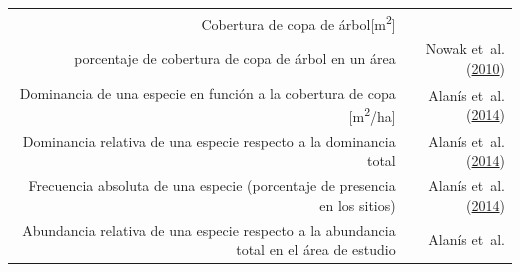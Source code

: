 \documentclass[12pt,a4paper,openany]{book}
\theoremstyle{definition}
\theoremstyle{definition}
\theoremstyle{definition}
\theoremstyle{remark}
\begin{document}
\begin{longtable}[]{@{}rr@{}}
\begin{minipage}[t]{0.57\columnwidth}\raggedleft\strut
Cobertura de copa de árbol{[}m\textsuperscript{2}{]}\strut
\end{minipage} & \begin{minipage}[t]{0.31\columnwidth}\raggedleft\strut
\strut
\end{minipage}\tabularnewline
\begin{minipage}[t]{0.57\columnwidth}\raggedleft\strut
porcentaje de cobertura de copa de árbol en un área\strut
\end{minipage} & \begin{minipage}[t]{0.31\columnwidth}\raggedleft\strut
Nowak et~al. (\protect\hyperlink{ref-nowak_sustaining_2010}{2010})\strut
\end{minipage}\tabularnewline
\begin{minipage}[t]{0.57\columnwidth}\raggedleft\strut
Dominancia de una especie en función a la cobertura de copa
{[}m\textsuperscript{2}/ha{]}\strut
\end{minipage} & \begin{minipage}[t]{0.31\columnwidth}\raggedleft\strut
Alanís et~al.
(\protect\hyperlink{ref-alanis_estructura_2014}{2014})\strut
\end{minipage}\tabularnewline
\begin{minipage}[t]{0.57\columnwidth}\raggedleft\strut
Dominancia relativa de una especie respecto a la dominancia total\strut
\end{minipage} & \begin{minipage}[t]{0.31\columnwidth}\raggedleft\strut
Alanís et~al.
(\protect\hyperlink{ref-alanis_estructura_2014}{2014})\strut
\end{minipage}\tabularnewline
\begin{minipage}[t]{0.57\columnwidth}\raggedleft\strut
Frecuencia absoluta de una especie (porcentaje de presencia en los
sitios)\strut
\end{minipage} & \begin{minipage}[t]{0.31\columnwidth}\raggedleft\strut
Alanís et~al.
(\protect\hyperlink{ref-alanis_estructura_2014}{2014})\strut
\end{minipage}\tabularnewline
\begin{minipage}[t]{0.57\columnwidth}\raggedleft\strut
Abundancia relativa de una especie respecto a la abundancia total en el
área de estudio\strut
\end{minipage} & \begin{minipage}[t]{0.31\columnwidth}\raggedleft\strut
Alanís et~al.

\end{minipage}
\end{longtable}
\end{document}

